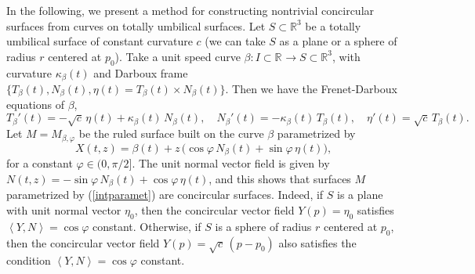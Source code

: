 \documentclass[eqnumis, pdf]{hjms}
\def\R#1{\ensuremath{\mathbb{R}^{#1}}}
\def\<{\left<}
\def\>{\right>}
\begin{document}
In the following, we present a method for constructing nontrivial concircular surfaces from curves on totally umbilical surfaces.
Let $S\subset\R3$ be a totally umbilical surface of constant curvature $c$ (we can take $S$ as a plane or a sphere of radius $r$ centered at $p_0$). Take a unit speed curve $\beta:I\subset\R{}\to S\subset\R3$, with curvature $\kappa_\beta(t)$ and Darboux frame $\{T_\beta(t),N_\beta(t),\eta(t)=T_\beta(t)\times N_\beta(t)\}$. Then we have the Frenet-Darboux equations of $\beta$,
\[
T_\beta'(t) = -\sqrt{c}\,\eta(t)+\kappa_\beta(t)\,N_\beta(t),\quad
N_\beta'(t) = -\kappa_\beta(t)\,T_\beta(t),\quad
   \eta'(t) = \sqrt{c}\,T_\beta(t).
\]
Let $M=M_{\beta,\varphi}$ be the ruled surface built on the curve $\beta$ parametrized by
\begin{equation}\label{intparamet}
X(t,z)=\beta(t)+z\,\big(\cos\varphi\,N_\beta(t)+\sin\varphi\,\eta(t)\big),
\end{equation}
for a constant $\varphi\in(0,\pi/2]$.
The unit normal vector field is given by
$N(t,z)=-\sin\varphi\, N_\beta(t)+\cos\varphi\,\eta(t)$,
and this shows that surfaces $M$ parametrized by (\ref{intparamet}) are concircular surfaces. Indeed, if $S$ is a plane with unit normal vector $\eta_0$, then the concircular vector field $Y(p)=\eta_0$ satisfies $\<Y,N\>=\cos\varphi$ constant. Otherwise, if $S$ is a sphere of radius $r$ centered at $p_0$, then the concircular vector field $Y(p)=\sqrt{c}\,(p-p_0)$ also satisfies the condition $\<Y,N\>=\cos\varphi$ constant.
\end{document}
